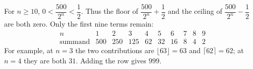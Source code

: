 For $n\ge10$, $0<\dfrac{500}{2^n}<\dfrac{1}{2}$. Thus the floor of $\dfrac{500}{2^n}+\dfrac{1}{2}$ and the ceiling of $\dfrac{500}{2^n}-\dfrac{1}{2}$ are both zero. Only the first nine terms remain:
\[
\begin{array}{c|rrrrrrrrr}
n&1&2&3&4&5&6&7&8&9\\\hline
\text{summand}&500&250&125&62&32&16&8&4&2
\end{array}
\]
For example, at $n=3$ the two contributions are $\lfloor63\rfloor=63$ and $\lceil62\rceil=62$; at $n=4$ they are both $31$. Adding the row gives $\boxed{999}$.
